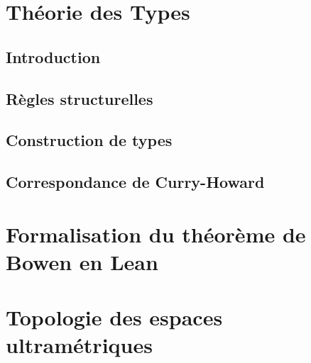\documentclass[a4paper, 11pt, twoside]{article}
\title{\Title}
\author{\Author}
\date{\today}
\begin{document}
  \maketitle
  \newpage
  \tableofcontents
  \newpage

  \section{Théorie des Types}
    \subsection{Introduction}
      


    \subsection{Règles structurelles}
      

    \subsection{Construction de types}
      

    \subsection{Correspondance de Curry-Howard}

  \newpage
  \section{Formalisation du théorème de Bowen en Lean}
    

  \newpage
  \section{Topologie des espaces ultramétriques}
    

\end{document}
